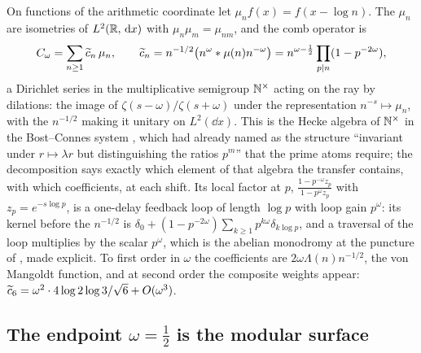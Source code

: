 On functions of the arithmetic coordinate let $\mu_nf(x)=f(x-\log n)$. The
$\mu_n$ are isometries of $L^2(\mathbb R,\,\mathrm d x)$ with $\mu_n\mu_m=\mu_{nm}$, and the
comb operator is
\begin{equation}\label{eq:heckeop}
 C_\omega=\sum_{n\geq1}\widetilde c_n\,\mu_n,\qquad
 \widetilde c_n=n^{-1/2}\big(n^{\omega}*\mu(n)n^{-\omega}\big)=n^{\omega-\frac12}\prod_{p\mid n}(1-p^{-2\omega}),
\end{equation}
a Dirichlet series in the multiplicative semigroup $\mathbb N^\times$ acting on the
ray by dilations: the image of $\zeta(s-\omega)/\zeta(s+\omega)$ under the
representation $n^{-s}\mapsto\mu_n$, with the $n^{-1/2}$ making it unitary on
$L^2(\dd x)$. This is the Hecke algebra of $\mathbb N^\times$ in the Bost--Connes
system \cite{BostConnes}, which \cite[Section~10.4]{WilsonLines} had already
named as the structure ``invariant under $r\mapsto\lambda r$ but distinguishing
the ratios $p^m$'' that the prime atoms require; the decomposition says exactly
which element of that algebra the transfer contains, with which coefficients,
at each shift. Its local factor at $p$, $\frac{1-p^{-\omega}z_p}{1-p^{\omega}z_p}$
with $z_p=e^{-s\log p}$, is a one-delay feedback loop of length $\log p$ with
loop gain $p^{\omega}$: its kernel before the $n^{-1/2}$ is
$\delta_0+(1-p^{-2\omega})\sum_{k\geq1}p^{k\omega}\delta_{k\log p}$, and a
traversal of the loop multiplies by the scalar $p^\omega$, which is the abelian
monodromy at the puncture of \cite[Section~9.4]{WilsonLines}, made explicit.
To first order in $\omega$ the coefficients are $2\omega\Lambda(n)n^{-1/2}$,
the von Mangoldt function, and at second order the composite weights appear:
$\widetilde c_6=\omega^2\cdot4\log2\log3/\sqrt6+O(\omega^3)$.

\subsection{The endpoint \texorpdfstring{$\omega=\frac12$}{omega = 1/2} is the modular surface}\label{sec:endpoint}

